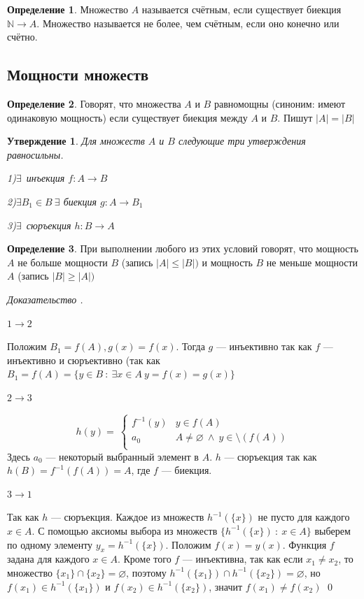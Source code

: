 \documentclass[12pt,oneside]{article}
\newtheorem{statement}{Утверждение}[section]
\theoremstyle{definition}
\newtheorem{definition}{Определение}
\newenvironment{ourproof}[1]{\textit{Доказательство #1.}}{\qed}
\begin{document}
\begin{definition}
Множество $A$ называется счётным, если существует биекция $\mathbb{N} \longrightarrow A$. Множество называется не более, чем счётным, если оно конечно или счётно.
\end{definition}

\subsection{Мощности множеств}

\begin{definition}
Говорят, что множества $A$ и $B$ равномощны (синоним: имеют одинаковую мощность) если существует биекция между $A$ и $B$. Пишут $|A|=|B|$
\end{definition}

\begin{statement}\label{geqmn}
Для множеств $A$ и $B$ следующие три утверждения равносильны.

1)$\exists$\ инъекция $f : A \longrightarrow B$

2)$\exists B_1\in B\ \exists $ биекция $g : A \longrightarrow B_1$

3)$\exists$\ сюръекция $h : B \longrightarrow A$
\end{statement}
\begin{definition}
При выполнении любого из этих условий говорят, что мощность $A$ не больше мощности $B$ (запись $|A| \leqslant |B|)$ и мощность $B$ не меньше мощности $A$ (запись $|B|\geqslant |A|)$
\end{definition}
\begin{ourproof}{}

$1 \longrightarrow 2$

Положим $B_1=f(A), g(x)=f(x)$. Тогда $g$ --- инъективно так как $f$ --- инъективно и сюръективно (так как $B_1=f(A)=\{y\in B\ :\ \exists x\in A\ y=f(x)=g(x)\}$

$2 \longrightarrow 3$

$$h(y) = \
        \begin{cases}
        f^{-1}(y) & y\in f(A) \\
        a_0 & A\neq \varnothing\ \wedge\ y\in \setminus (f(A)) \\
        \end{cases}$$
Здесь $a_0$ --- некоторый выбранный элемент в $A$. $h$ --- сюръекция так как $h(B)=f^{-1}(f(A))=A$, где $f$ --- биекция.

$3 \longrightarrow 1$

Так как $h$ --- сюръекция. Каждое из множеств $h^{-1}(\{x\})$ не пусто для каждого $x\in A$. С помощью аксиомы выбора из множеств $\{h^{-1}(\{x\})\ :\ x\in A\}$ выберем по одному элементу $y_x=h^{-1}(\{x\})$. Положим $f(x)=y(x)$. Функция $f$ задана для каждого $x\in A$. Кроме того $f$ --- инъективна, так как если $x_1\neq x_2$, то множество $\{x_1\}\cap \{x_2\}=\varnothing$, поэтому $h^{-1}(\{x_1\})\cap h^{-1}(\{x_2\})=\varnothing$, но
\newline
$f(x_1)\in h^{-1}(\{x_1\})$ и $f(x_2)\in h^{-1}(\{x_2\})$, значит $f(x_1)\neq f(x_2)$
\end{ourproof}
\end{document}
